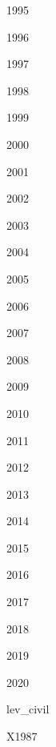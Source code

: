 \documentclass[
]{book}
\begin{document}
1995

1996

1997

1998

1999

2000

2001

2002

2003

2004

2005

2006

2007

2008

2009

2010

2011

2012

2013

2014

2015

2016

2017

2018

2019

2020

lev\_civil

X1987
\end{document}
